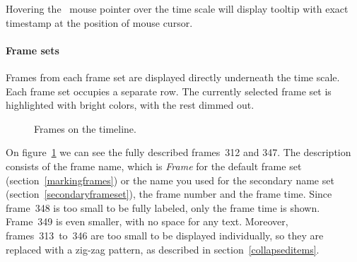 \documentclass[hidelinks,titlepage,a4paper]{article}
\begin{document}
Hovering the \faMousePointer{}~mouse pointer over the time scale will display tooltip with exact timestamp at the position of mouse cursor.

\paragraph{Frame sets}
\label{framesets}

Frames from each frame set are displayed directly underneath the time scale. Each frame set occupies a separate row. The currently selected frame set is highlighted with bright colors, with the rest dimmed out.

\begin{figure}[h]
\centering{}
\caption{Frames on the timeline.}
\label{framesetsfig}
\end{figure}

On figure~\ref{framesetsfig} we can see the fully described frames~312 and 347. The description consists of the frame name, which is \emph{Frame} for the default frame set (section~\ref{markingframes}) or the name you used for the secondary name set (section~\ref{secondaryframeset}), the frame number and the frame time. Since frame~348 is too small to be fully labeled, only the frame time is shown. Frame~349 is even smaller, with no space for any text. Moreover, frames~313~to~346 are too small to be displayed individually, so they are replaced with a zig-zag pattern, as described in section~\ref{collapseditems}.
\end{document}
